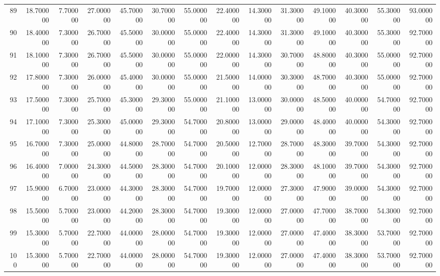 \begin{tabular}{rrrrrrrrrrrrrr}
89 & 18.700000 & 7.700000 & 27.000000 & 45.700000 & 30.700000 & 55.000000 & 22.400000 & 14.300000 & 31.300000 & 49.100000 & 40.300000 & 55.300000 & 93.000000 \\
90 & 18.400000 & 7.300000 & 26.700000 & 45.500000 & 30.000000 & 55.000000 & 22.400000 & 14.300000 & 31.300000 & 49.100000 & 40.300000 & 55.300000 & 92.700000 \\
91 & 18.100000 & 7.300000 & 26.700000 & 45.500000 & 30.000000 & 55.000000 & 22.000000 & 14.300000 & 30.700000 & 48.800000 & 40.300000 & 55.000000 & 92.700000 \\
92 & 17.800000 & 7.300000 & 26.000000 & 45.400000 & 30.000000 & 55.000000 & 21.500000 & 14.000000 & 30.300000 & 48.700000 & 40.300000 & 55.000000 & 92.700000 \\
93 & 17.500000 & 7.300000 & 25.700000 & 45.300000 & 29.300000 & 55.000000 & 21.100000 & 13.000000 & 30.000000 & 48.500000 & 40.000000 & 54.700000 & 92.700000 \\
94 & 17.100000 & 7.300000 & 25.300000 & 45.000000 & 29.300000 & 54.700000 & 20.800000 & 13.000000 & 29.000000 & 48.400000 & 40.000000 & 54.300000 & 92.700000 \\
95 & 16.700000 & 7.300000 & 25.000000 & 44.800000 & 28.700000 & 54.700000 & 20.500000 & 12.700000 & 28.700000 & 48.300000 & 39.700000 & 54.300000 & 92.700000 \\
96 & 16.400000 & 7.000000 & 24.300000 & 44.500000 & 28.300000 & 54.700000 & 20.100000 & 12.000000 & 28.300000 & 48.100000 & 39.700000 & 54.300000 & 92.700000 \\
97 & 15.900000 & 6.700000 & 23.000000 & 44.300000 & 28.300000 & 54.700000 & 19.700000 & 12.000000 & 27.300000 & 47.900000 & 39.000000 & 54.300000 & 92.700000 \\
98 & 15.500000 & 5.700000 & 23.000000 & 44.200000 & 28.300000 & 54.700000 & 19.300000 & 12.000000 & 27.000000 & 47.700000 & 38.700000 & 54.300000 & 92.700000 \\
99 & 15.300000 & 5.700000 & 22.700000 & 44.000000 & 28.000000 & 54.700000 & 19.300000 & 12.000000 & 27.000000 & 47.400000 & 38.300000 & 53.700000 & 92.700000 \\
100 & 15.300000 & 5.700000 & 22.700000 & 44.000000 & 28.000000 & 54.700000 & 19.300000 & 12.000000 & 27.000000 & 47.400000 & 38.300000 & 53.700000 & 92.700000 \\
\bottomrule
\end{tabular}
